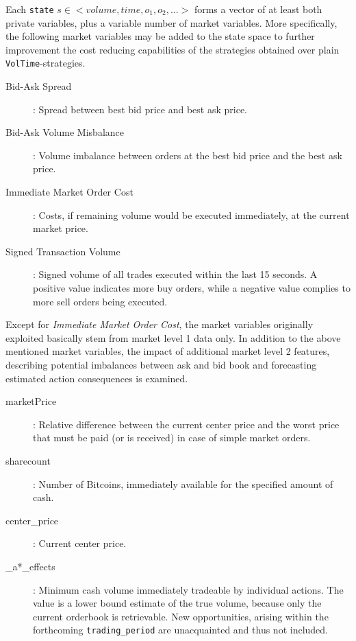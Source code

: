 Each \lstinline!state! $s \in <volume, time, o_1, o_2, ...>$ forms a vector of at least both private variables, plus a variable number of market variables. More specifically, the following market variables may be added to the state space to further improvement the cost reducing capabilities of the strategies obtained over plain \lstinline!VolTime!-strategies.

\begin{description}
\item[Bid-Ask Spread]: Spread between best bid price and best ask price.
\item[Bid-Ask Volume Misbalance]: Volume imbalance between orders at the best bid price and the best ask price.
\item[Immediate Market Order Cost]: Costs, if remaining volume would be executed immediately, at the current market price.
\item[Signed Transaction Volume]: Signed volume of all trades executed within the last 15 seconds. A positive value indicates more buy orders, while a negative value complies to more sell orders being executed.
\end{description}

Except for \emph{Immediate Market Order Cost}, the market variables originally exploited basically stem from market level 1 data only. In addition to the above mentioned market variables, the impact of additional market level 2 features, describing potential imbalances between ask and bid book and forecasting estimated action consequences is examined.
\begin{description}
\item[marketPrice] : Relative difference between the current center price and the worst price that must be paid (or is received) in case of simple market orders.

\item[sharecount] : Number of Bitcoins, immediately available for the specified amount of cash.

\item[center\_price] : Current center price.

\item[\_a*\_effects] : Minimum cash volume immediately tradeable by individual actions. The value is a lower bound estimate of the true volume, because only the current orderbook is retrievable. New opportunities, arising within the forthcoming \lstinline!trading_period! are unacquainted and thus not included.
\end{description}

